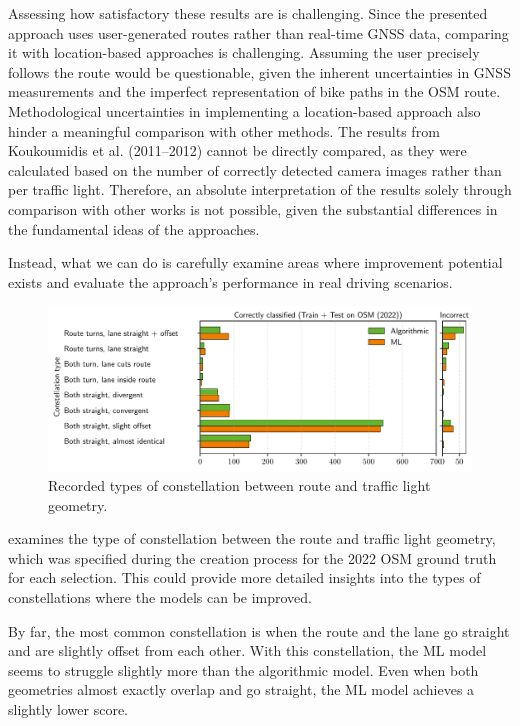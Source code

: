 Assessing how satisfactory these results are is challenging. Since the presented approach uses user-generated routes rather than real-time GNSS data, comparing it with location-based approaches is challenging. Assuming the user precisely follows the route would be questionable, given the inherent uncertainties in GNSS measurements and the imperfect representation of bike paths in the OSM route. Methodological uncertainties in implementing a location-based approach also hinder a meaningful comparison with other methods. The results from Koukoumidis et al. (2011–2012) \cite{koukoumidis_signalguru_2011, koukoumidis_leveraging_2012} cannot be directly compared, as they were calculated based on the number of correctly detected camera images rather than per traffic light. Therefore, an absolute interpretation of the results solely through comparison with other works is not possible, given the substantial differences in the fundamental ideas of the approaches.

Instead, what we can do is carefully examine areas where improvement potential exists and evaluate the approach's performance in real driving scenarios.

\begin{figure}[t]
\centering 
\includegraphics[width=\linewidth]{images/matching-constellations-osm-old.pdf}
\caption{Recorded types of constellation between route and traffic light geometry.}
\label{fig:matching-constellations-osm}
\end{figure}

 examines the type of constellation between the route and traffic light geometry, which was specified during the creation process for the 2022 OSM ground truth for each selection. This could provide more detailed insights into the types of constellations where the models can be improved.

By far, the most common constellation is when the route and the lane go straight and are slightly offset from each other. With this constellation, the ML model seems to struggle slightly more than the algorithmic model. Even when both geometries almost exactly overlap and go straight, the ML model achieves a slightly lower score.

